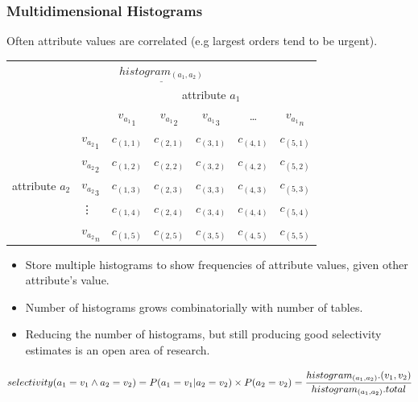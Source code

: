 \subsubsection{Multidimensional Histograms}
Often attribute values are correlated (e.g largest orders tend to be urgent).
\begin{center}
    \begin{tabular}{l l c c c c c}
        \multicolumn{7}{c}{$\underline{histogram_{(a_1, a_2)}}$} \\
                                         &               & \multicolumn{5}{c}{attribute $a_1$} \\
                                         &               & ${v_{a_1}}_1$ & ${v_{a_1}}_2$ & ${v_{a_1}}_3$ & \dots     & ${v_{a_1}}_n$ \\
        \multirow{5}{*}{attribute $a_2$} & ${v_{a_2}}_1$ & $c_{(1,1)}$   & $c_{(2,1)}$   & $c_{(3,1)}$ & $c_{(4,1)}$ & $c_{(5,1)}$   \\
                                         & ${v_{a_2}}_2$ & $c_{(1,2)}$   & $c_{(2,2)}$   & $c_{(3,2)}$ & $c_{(4,2)}$ & $c_{(5,2)}$   \\
                                         & ${v_{a_2}}_3$ & $c_{(1,3)}$   & $c_{(2,3)}$   & $c_{(3,3)}$ & $c_{(4,3)}$ & $c_{(5,3)}$   \\
                                         & \vdots        & $c_{(1,4)}$   & $c_{(2,4)}$   & $c_{(3,4)}$ & $c_{(4,4)}$ & $c_{(5,4)}$   \\
                                         & ${v_{a_2}}_n$ & $c_{(1,5)}$   & $c_{(2,5)}$   & $c_{(3,5)}$ & $c_{(4,5)}$ & $c_{(5,5)}$   \\
    \end{tabular}
\end{center}

\begin{itemize}
    \item Store multiple histograms to show frequencies of attribute values, given other attribute's value.
    \item Number of histograms grows combinatorially with number of tables. \toimprove
    \item Reducing the number of histograms, but still producing good selectivity estimates is an open area of research.
\end{itemize}
\[selectivity(a_1 = v_1 \land a_2 = v_2) = P(a_1 = v_1 | a_2 = v_2) \times P(a_2 = v_2) = \cfrac{histogram_{(a_1, a_2)}.(v_1, v_2)}{histogram_{(a_1, a_2)}.total} \]


